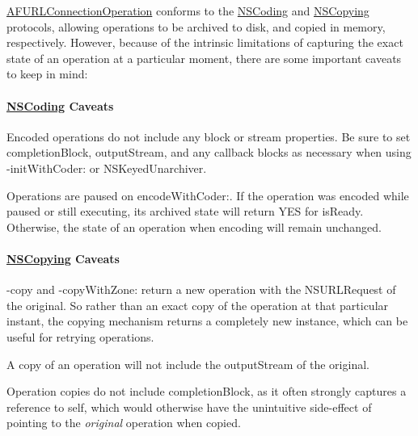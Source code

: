 {\ttfamily \mbox{\hyperlink{interface_a_f_u_r_l_connection_operation}{A\+F\+U\+R\+L\+Connection\+Operation}}} conforms to the {\ttfamily \mbox{\hyperlink{class_n_s_coding-p}{N\+S\+Coding}}} and {\ttfamily \mbox{\hyperlink{class_n_s_copying-p}{N\+S\+Copying}}} protocols, allowing operations to be archived to disk, and copied in memory, respectively. However, because of the intrinsic limitations of capturing the exact state of an operation at a particular moment, there are some important caveats to keep in mind\+:

\paragraph*{\mbox{\hyperlink{class_n_s_coding-p}{N\+S\+Coding}} Caveats}


\begin{DoxyItemize}
\item Encoded operations do not include any block or stream properties. Be sure to set {\ttfamily completion\+Block}, {\ttfamily output\+Stream}, and any callback blocks as necessary when using {\ttfamily -\/init\+With\+Coder\+:} or {\ttfamily N\+S\+Keyed\+Unarchiver}.
\item Operations are paused on {\ttfamily encode\+With\+Coder\+:}. If the operation was encoded while paused or still executing, its archived state will return {\ttfamily Y\+ES} for {\ttfamily is\+Ready}. Otherwise, the state of an operation when encoding will remain unchanged.
\end{DoxyItemize}

\paragraph*{\mbox{\hyperlink{class_n_s_copying-p}{N\+S\+Copying}} Caveats}


\begin{DoxyItemize}
\item {\ttfamily -\/copy} and {\ttfamily -\/copy\+With\+Zone\+:} return a new operation with the {\ttfamily N\+S\+U\+R\+L\+Request} of the original. So rather than an exact copy of the operation at that particular instant, the copying mechanism returns a completely new instance, which can be useful for retrying operations.
\item A copy of an operation will not include the {\ttfamily output\+Stream} of the original.
\item Operation copies do not include {\ttfamily completion\+Block}, as it often strongly captures a reference to {\ttfamily self}, which would otherwise have the unintuitive side-\/effect of pointing to the {\itshape original} operation when copied. 
\end{DoxyItemize}

